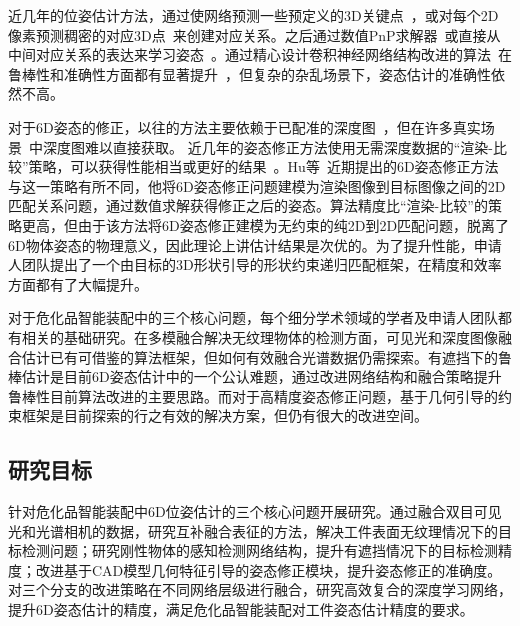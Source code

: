 \documentclass[12pt]{article}
\begin{document}
近几年的位姿估计方法，通过使网络预测一些预定义的3D关键点~\cite{rad2017bb8, hu2019segDriven, peng2019pvnet, Hu2021}，或对每个2D像素预测稠密的对应3D点~\cite{zakharov2019dpod, Su2022, li2019cdpn, wang2021gdrnet, Di2021}来创建对应关系。之后通过数值PnP求解器~\cite{lepetit2009epnp}或直接从中间对应关系的表达来学习姿态~\cite{hu2020singleStage, EroPnP,wang2021gdrnet, Di2021}。通过精心设计卷积神经网络结构改进的算法~\cite{he2016resnet, resnext_2017_cvpr}在鲁棒性和准确性方面都有显著提升~\cite{Xiang2018, peng2019pvnet, wang2019densefusion60}，但复杂的杂乱场景下，姿态估计的准确性依然不高。

对于6D姿态的修正，以往的方法主要依赖于已配准的深度图~\cite{Xiang2018, li2019cdpn, wang2019densefusion60}，但在许多真实场景~\cite{Hu2021}中深度图难以直接获取。
近几年的姿态修正方法使用无需深度数据的“渲染-比较”策略，可以获得性能相当或更好的结果~\cite{li2018deepim, zakharov2019dpod, cosypose, rad2017bb8, Hu2022, Lipson2022, RNNPose_2022_cvpr,Repose_2021_iccv}。Hu等~\cite{Hu2022}近期提出的6D姿态修正方法与这一策略有所不同，他将6D姿态修正问题建模为渲染图像到目标图像之间的2D匹配关系问题，通过数值求解获得修正之后的姿态。算法精度比“渲染-比较”的策略更高，但由于该方法将6D姿态修正建模为无约束的纯2D到2D匹配问题，脱离了6D物体姿态的物理意义，因此理论上讲估计结果是次优的。为了提升性能，申请人团队提出了一个由目标的3D形状引导的形状约束递归匹配框架，在精度和效率方面都有了大幅提升\cite{?}。

对于危化品智能装配中的三个核心问题，每个细分学术领域的学者及申请人团队都有相关的基础研究。在多模融合解决无纹理物体的检测方面，可见光和深度图像融合估计已有可借鉴的算法框架，但如何有效融合光谱数据仍需探索。有遮挡下的鲁棒估计是目前6D姿态估计中的一个公认难题，通过改进网络结构和融合策略提升鲁棒性目前算法改进的主要思路。而对于高精度姿态修正问题，基于几何引导的约束框架是目前探索的行之有效的解决方案，但仍有很大的改进空间。

{


}



\subsection{研究目标}
针对危化品智能装配中6D位姿估计的三个核心问题开展研究。通过融合双目可见光和光谱相机的数据，研究互补融合表征的方法，解决工件表面无纹理情况下的目标检测问题；研究刚性物体的感知检测网络结构，提升有遮挡情况下的目标检测精度；改进基于CAD模型几何特征引导的姿态修正模块，提升姿态修正的准确度。对三个分支的改进策略在不同网络层级进行融合，研究高效复合的深度学习网络，提升6D姿态估计的精度，满足危化品智能装配对工件姿态估计精度的要求。
\end{document}
